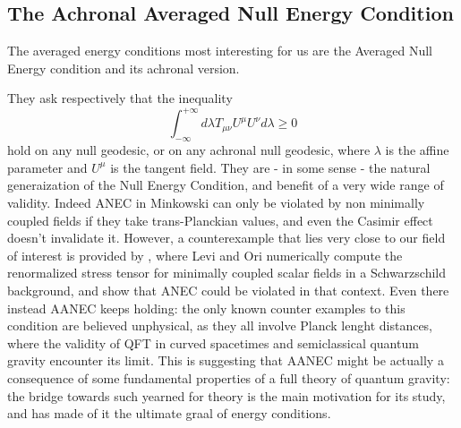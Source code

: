 \subsection{The Achronal Averaged Null Energy Condition}

The averaged energy conditions most interesting for us are the Averaged Null Energy condition and its achronal version.

\noindent
They ask respectively that the inequality
\begin{equation}
    \label{eq:ANEC}
    \int_{-\infty}^{+\infty} d\lambda T_{\mu\nu}U^{\mu}U^{\nu} d\lambda \ge 0    
\end{equation}
hold on any null geodesic, or on any achronal null geodesic, where \(\lambda\) is the affine parameter and \(U^{\mu}\) is the tangent field. They are - in some sense - the natural generaization of the Null Energy Condition, and benefit of a very wide range of validity. 
\noindent
Indeed ANEC in Minkowski can only be violated by non minimally coupled fields if they take trans-Planckian values, and even the Casimir effect doesn't invalidate it.
However, a counterexample that lies very close to our field of interest is provided by \cite[]{levi2016versatile}, where Levi and Ori numerically compute the renormalized stress tensor for minimally coupled scalar fields in a Schwarzschild background, and show that ANEC could be violated in that context. 
Even there instead AANEC keeps holding: the only known counter examples to this condition are believed unphysical, as they all involve Planck lenght distances, where the validity of QFT in curved spacetimes and semiclassical quantum gravity encounter its limit. This is suggesting that AANEC might be actually a consequence of some fundamental properties of a full theory of quantum gravity: the bridge towards such yearned for theory is the main motivation for its study, and has made of it the ultimate graal of energy conditions.

